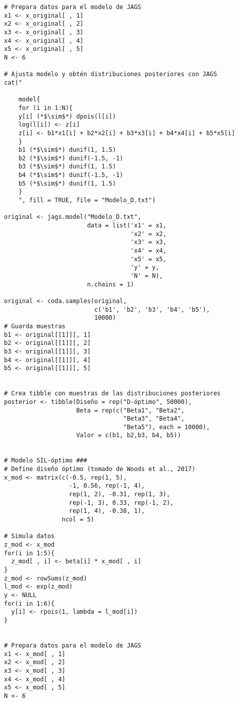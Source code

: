 \begin{lstlisting}
# Prepara datos para el modelo de JAGS
x1 <- x_original[ , 1]
x2 <- x_original[ , 2]
x3 <- x_original[ , 3]
x4 <- x_original[ , 4]
x5 <- x_original[ , 5]
N <- 6

# Ajusta modelo y obtén distribuciones posteriores con JAGS
cat("
    
    model{
    for (i in 1:N){
    y[i] (*$\sim$*) dpois(l[i])
    log(l[i]) <- z[i]
    z[i] <- b1*x1[i] + b2*x2[i] + b3*x3[i] + b4*x4[i] + b5*x5[i]
    }
    b1 (*$\sim$*) dunif(1, 1.5)
    b2 (*$\sim$*) dunif(-1.5, -1)
    b3 (*$\sim$*) dunif(1, 1.5)
    b4 (*$\sim$*) dunif(-1.5, -1)
    b5 (*$\sim$*) dunif(1, 1.5)
    }
    ", fill = TRUE, file = "Modelo_D.txt")

original <- jags.model("Modelo_D.txt",
                       data = list('x1' = x1,
                                   'x2' = x2,
                                   'x3' = x3,
                                   'x4' = x4,
                                   'x5' = x5,
                                   'y' = y,
                                   'N' = N),
                       n.chains = 1)

original <- coda.samples(original,
                         c('b1', 'b2', 'b3', 'b4', 'b5'),
                         10000)
# Guarda muestras
b1 <- original[[1]][, 1]
b2 <- original[[1]][, 2]
b3 <- original[[1]][, 3]
b4 <- original[[1]][, 4]
b5 <- original[[1]][, 5]


# Crea tibble con muestras de las distribuciones posteriores
posterior <- tibble(Diseño = rep("D-óptimo", 50000),
                    Beta = rep(c("Beta1", "Beta2",
                                 "Beta3", "Beta4",
                                 "Beta5"), each = 10000),
                    Valor = c(b1, b2,b3, b4, b5))


# Modelo SIL-óptimo ###
# Define diseño óptimo (tomado de Woods et al., 2017)
x_mod <- matrix(c(-0.5, rep(1, 5),
                  -1, 0.56, rep(-1, 4),
                  rep(1, 2), -0.31, rep(1, 3),
                  rep(-1, 3), 0.33, rep(-1, 2),
                  rep(1, 4), -0.38, 1),
                ncol = 5)

# Simula datos
z_mod <- x_mod
for(i in 1:5){
  z_mod[ , i] <- beta[i] * x_mod[ , i]
}
z_mod <- rowSums(z_mod)
l_mod <- exp(z_mod)
y <- NULL
for(i in 1:6){
  y[i] <- rpois(1, lambda = l_mod[i])
}


# Prepara datos para el modelo de JAGS
x1 <- x_mod[ , 1]
x2 <- x_mod[ , 2]
x3 <- x_mod[ , 3]
x4 <- x_mod[ , 4]
x5 <- x_mod[ , 5]
N <- 6


\end{lstlisting}
